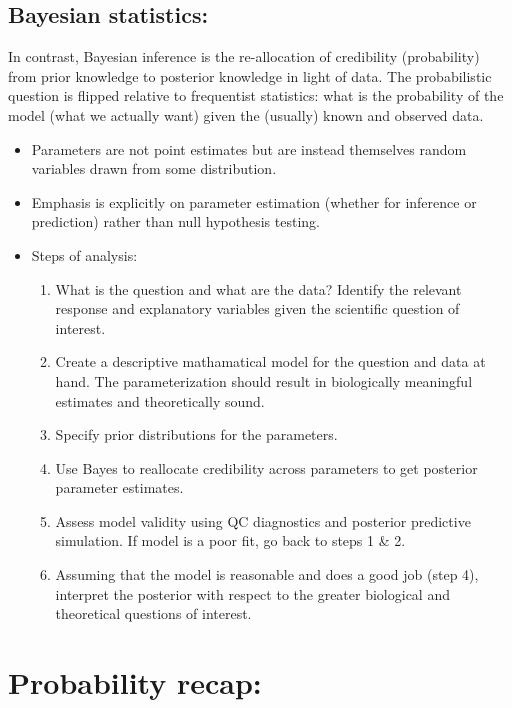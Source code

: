 \documentclass[12pt]{article}
\begin{document}
\subsection*{Bayesian statistics:}
In contrast, Bayesian inference is the re-allocation of credibility (probability) from prior knowledge to posterior knowledge in light of data. The probabilistic question is flipped relative to frequentist statistics: what is the probability of the model (what we actually want) given the (usually) known and observed data. 
\begin{itemize}  
  \item Parameters are not point estimates but are instead themselves random variables drawn from some distribution.
  
  \item Emphasis is explicitly on parameter estimation (whether for inference or prediction) rather than null hypothesis testing.
  
  \item Steps of analysis: 
  \begin{enumerate}
    \item What is the question and what are the data? Identify the relevant response and explanatory variables given the scientific question of interest.
    
    \item Create a descriptive mathamatical model for the question and data at hand. The parameterization should result in biologically meaningful estimates and theoretically sound.
    
    \item Specify prior distributions for the parameters.
  
    \item Use Bayes to reallocate credibility across parameters to get posterior parameter estimates.
    
    \item Assess model validity using QC diagnostics and posterior predictive simulation. If model is a poor fit, go back to steps 1 \& 2.
    
     \item Assuming that the model is reasonable and does a good job (step 4), interpret the posterior with respect to the greater biological and theoretical questions of interest.
  \end{enumerate}
\end{itemize}


\section{Probability recap:}
\end{document}
